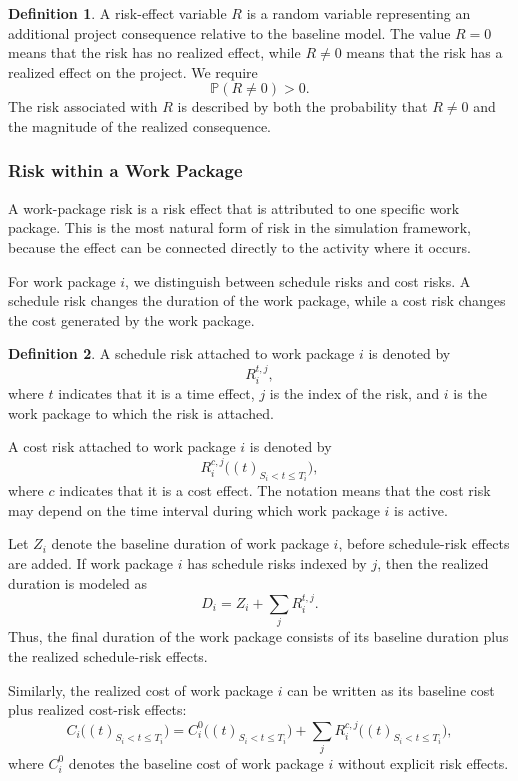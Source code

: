 \documentclass[11pt,a4paper]{article}
\newcommand{\pP}{\mathbb{P}}
\newcommand{\1}{\mathbf{1}}
\theoremstyle{definition}
\newtheorem{definition}{Definition}[section]
\theoremstyle{plain}
\theoremstyle{remark}
\numberwithin{equation}{section}
\begin{document}
\begin{definition}
A risk-effect variable $R$ is a random variable representing an additional project consequence relative to the baseline model. The value $R=0$ means that the risk has no realized effect, while $R\neq 0$ means that the risk has a realized effect on the project. We require
\[
\pP(R\neq 0)>0.
\]
The risk associated with $R$ is described by both the probability that $R\neq 0$ and the magnitude of the realized consequence.
\end{definition}

\subsubsection{Risk within a Work Package}

A work-package risk is a risk effect that is attributed to one specific work package. This is the most natural form of risk in the simulation framework, because the effect can be connected directly to the activity where it occurs.

For work package $i$, we distinguish between schedule risks and cost risks. A schedule risk changes the duration of the work package, while a cost risk changes the cost generated by the work package.

\begin{definition}
A schedule risk attached to work package $i$ is denoted by
\[
R_i^{t,j},
\]
where $t$ indicates that it is a time effect, $j$ is the index of the risk, and $i$ is the work package to which the risk is attached.

A cost risk attached to work package $i$ is denoted by
\[
R_i^{c,j}\bigl((t)_{S_i<t\leq T_i}\bigr),
\]
where $c$ indicates that it is a cost effect. The notation means that the cost risk may depend on the time interval during which work package $i$ is active.
\end{definition}

Let $Z_i$ denote the baseline duration of work package $i$, before schedule-risk effects are added. If work package $i$ has schedule risks indexed by $j$, then the realized duration is modeled as
\[
D_i
=
Z_i+\sum_j R_i^{t,j}.
\]
Thus, the final duration of the work package consists of its baseline duration plus the realized schedule-risk effects.

Similarly, the realized cost of work package $i$ can be written as its baseline cost plus realized cost-risk effects:
\[
C_i\bigl((t)_{S_i<t\leq T_i}\bigr)
=
C_i^{0}\bigl((t)_{S_i<t\leq T_i}\bigr)
+
\sum_j R_i^{c,j}\bigl((t)_{S_i<t\leq T_i}\bigr),
\]
where $C_i^{0}$ denotes the baseline cost of work package $i$ without explicit risk effects.
\end{document}
